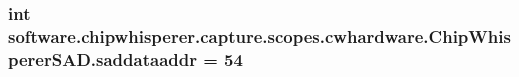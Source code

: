 \subsubsection[{saddataaddr}]{\setlength{\rightskip}{0pt plus 5cm}int software.\+chipwhisperer.\+capture.\+scopes.\+cwhardware.\+Chip\+Whisperer\+S\+A\+D.\+saddataaddr = 54}\label{namespacesoftware_1_1chipwhisperer_1_1capture_1_1scopes_1_1cwhardware_1_1ChipWhispererSAD_a4f254c68ca42345ee1e16b405d2f583e}
